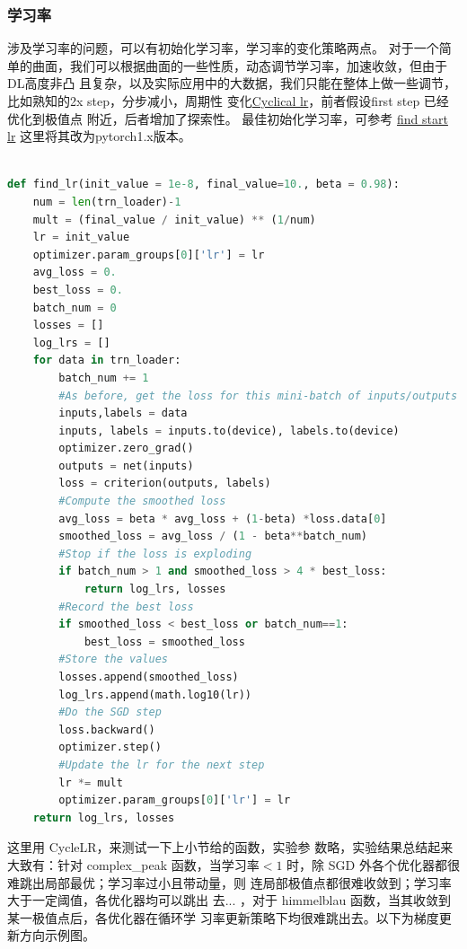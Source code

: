 \documentclass[UTF8]{ctexart}
\begin{document}
\subsubsection{学习率}
涉及学习率的问题，可以有初始化学习率，学习率的变化策略两点。
对于一个简单的曲面，我们可以根据曲面的一些性质，动态调节学习率，加速收敛，但由于DL高度非凸
且复杂，以及实际应用中的大数据，我们只能在整体上做一些调节，比如熟知的2x step，分步减小，周期性
变化\href{https://arxiv.org/abs/1506.01186}{Cyclical lr}，前者假设first step 已经优化到极值点
附近，后者增加了探索性。
最佳初始化学习率，可参考
\label{sub:lr}
\href{https://sgugger.github.io/how-do-you-find-a-good-learning-rate.html}{find start lr}
这里将其改为pytorch1.x版本。
\lstset{style=mystyle}
\begin{lstlisting}[language=Python]

def find_lr(init_value = 1e-8, final_value=10., beta = 0.98):
	num = len(trn_loader)-1
	mult = (final_value / init_value) ** (1/num)
	lr = init_value
	optimizer.param_groups[0]['lr'] = lr
	avg_loss = 0.
	best_loss = 0.
	batch_num = 0
	losses = []
	log_lrs = []
	for data in trn_loader:
		batch_num += 1
		#As before, get the loss for this mini-batch of inputs/outputs
		inputs,labels = data
		inputs, labels = inputs.to(device), labels.to(device)
		optimizer.zero_grad()
		outputs = net(inputs)
		loss = criterion(outputs, labels)
		#Compute the smoothed loss
		avg_loss = beta * avg_loss + (1-beta) *loss.data[0]
		smoothed_loss = avg_loss / (1 - beta**batch_num)
		#Stop if the loss is exploding
		if batch_num > 1 and smoothed_loss > 4 * best_loss:
			return log_lrs, losses
		#Record the best loss
		if smoothed_loss < best_loss or batch_num==1:
			best_loss = smoothed_loss
		#Store the values
		losses.append(smoothed_loss)
		log_lrs.append(math.log10(lr))
		#Do the SGD step
		loss.backward()
		optimizer.step()
		#Update the lr for the next step
		lr *= mult
		optimizer.param_groups[0]['lr'] = lr
	return log_lrs, losses
\end{lstlisting}

这里用 CycleLR，来测试一下上小节给的函数，实验参
数略，实验结果总结起来大致有：针对 complex\_peak 函数，当学习率$ < 1$
时，除 SGD 外各个优化器都很难跳出局部最优；学习率过小且带动量，则
连局部极值点都很难收敛到；学习率大于一定阈值，各优化器均可以跳出
去... ，对于 himmelblau 函数，当其收敛到某一极值点后，各优化器在循环学
习率更新策略下均很难跳出去。以下为梯度更新方向示例图。
\end{document}
